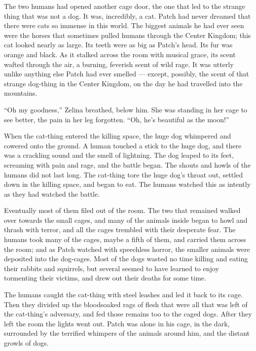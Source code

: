 \documentclass[ebook,oneside,openany,12pt]{memoir}
\begin{document}
The two humans had opened another cage door, the one that led to the
strange thing that was not a dog. It was, incredibly, a cat. Patch had
never dreamed that there were cats so immense in this world. The
biggest animals he had ever seen were the horses that sometimes pulled
humans through the Center Kingdom; this cat looked nearly as
large. Its teeth were as big as Patch’s head. Its fur was orange and
black. As it stalked across the room with musical grace, its scent
wafted through the air, a burning, feverish scent of wild rage. It was
utterly unlike anything else Patch had ever smelled — except,
possibly, the scent of that strange dog-thing in the Center Kingdom,
on the day he had travelled into the mountains.

“Oh my goodness,” Zelina breathed, below him. She was standing in her
cage to see better, the pain in her leg forgotten. “Oh, he’s beautiful
as the moon!”

When the cat-thing entered the killing space, the huge dog whimpered
and cowered onto the ground. A human touched a stick to the huge dog,
and there was a crackling sound and the smell of lightning. The dog
leaped to its feet, screaming with pain and rage, and the battle
began. The shouts and howls of the humans did not last long. The
cat-thing tore the huge dog’s throat out, settled down in the killing
space, and began to eat. The humans watched this as intently as they
had watched the battle.

Eventually most of them filed out of the room. The two that remained
walked over towards the small cages, and many of the animals inside
began to howl and thrash with terror, and all the cages trembled with
their desperate fear. The humans took many of the cages, maybe a fifth
of them, and carried them across the room; and as Patch watched with
speechless horror, the smaller animals were deposited into the
dog-cages. Most of the dogs wasted no time killing and eating their
rabbits and squirrels, but several seemed to have learned to enjoy
tormenting their victims, and drew out their deaths for some time.

The humans caught the cat-thing with steel leashes and led it back to
its cage. Then they divided up the bloodsoaked rags of flesh that were
all that was left of the cat-thing’s adversary, and fed those remains
too to the caged dogs. After they left the room the lights went
out. Patch was alone in his cage, in the dark, surrounded by the
terrified whimpers of the animals around him, and the distant growls
of dogs.
\end{document}
